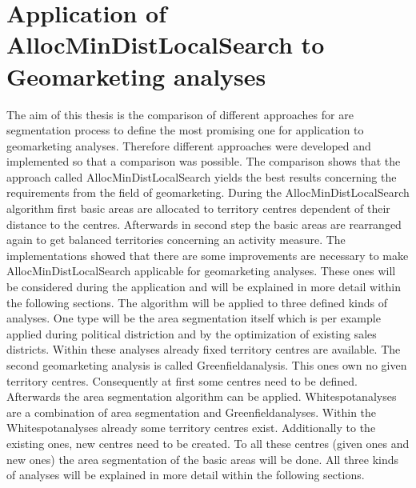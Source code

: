\section{Application of AllocMinDistLocalSearch to Geomarketing analyses}
The aim of this thesis is the comparison of different approaches for are segmentation process to define the most promising one for application to geomarketing analyses. Therefore different approaches were developed and implemented so that a comparison was possible. The comparison shows that the approach called AllocMinDistLocalSearch yields the best results concerning the requirements from the field of geomarketing. During the AllocMinDistLocalSearch algorithm first basic areas are allocated to territory centres dependent of their distance to the centres. Afterwards in second step the basic areas are rearranged again to get balanced territories concerning an activity measure. The implementations showed that there are some improvements are necessary to make AllocMinDistLocalSearch applicable for geomarketing analyses. These ones will be considered during the application and will be explained in more detail within the following sections. The algorithm will be applied to three defined kinds of analyses. One type will be the area segmentation itself which is per example applied during political distriction and by the optimization of existing sales districts. Within these analyses already fixed territory centres are available. The second geomarketing analysis is called Greenfieldanalysis. This ones own no given territory centres. Consequently at first some centres need to be defined. Afterwards the area segmentation algorithm can be applied. Whitespotanalyses are a combination of area segmentation and Greenfieldanalyses. Within the Whitespotanalyses already some territory centres exist. Additionally to the existing ones, new centres need to be created. To all these centres (given ones and new ones) the area segmentation of the basic areas will be done. All three kinds of analyses will be explained in more detail within the following sections. 


